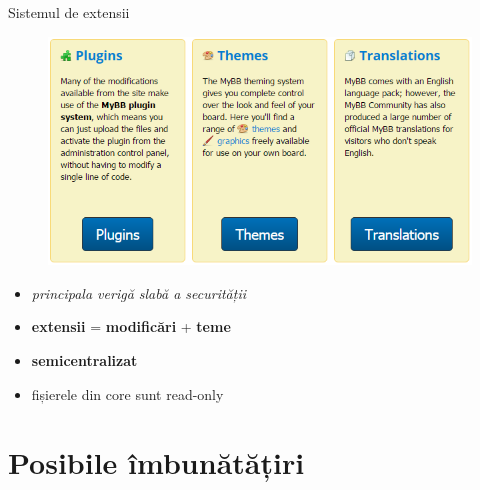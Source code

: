 \documentclass[9pt]{beamer}
\begin{document}
\begin{frame}{Sistemul de extensii}
    \begin{figure}
        \includegraphics[scale=0.4]{figures/screen5}
    \end{figure}

    \begin{itemize}
		\vskip10pt
		\item \textit{principala verigă slabă a securității}
		\vskip10pt
		\item \textbf{extensii} = \textbf{modificări} + \textbf{teme}
		\vskip10pt
		\item \textbf{semicentralizat}
		\vskip10pt
		\item fișierele din core sunt read-only
	\end{itemize}

\end{frame}

\section[]{Posibile îmbunătățiri}
\end{document}
